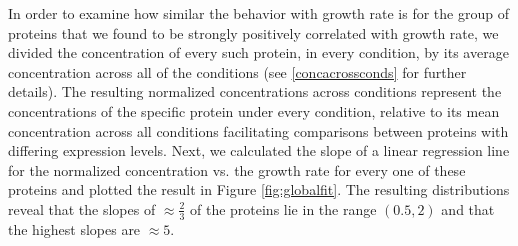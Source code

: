 In order to examine how similar the behavior with growth rate is for the group of proteins that we found to be strongly positively correlated with growth rate, we divided the concentration of every such protein, in every condition, by its average concentration across all of the conditions (see \ref{concacrossconds} for further details).
The resulting normalized concentrations across conditions represent the concentrations of the specific protein under every condition, relative to its mean concentration across all conditions facilitating comparisons between proteins with differing expression levels.
Next, we calculated the slope of a linear regression line for the normalized concentration vs. the growth rate for every one of these proteins and plotted the result in Figure \ref{fig:globalfit}.
The resulting distributions reveal that the slopes of $\approx \frac{2}{3}$ of the proteins lie in the range $(0.5,2)$ and that the highest slopes are $\approx 5$.